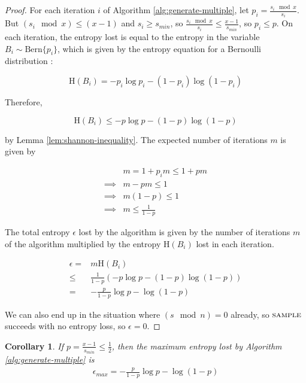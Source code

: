 \documentclass[lettersize,journal]{IEEEtran}
\newtheorem{corollary}{Corollary}
\newcommand{\bern}[1]{\mathrm{Bern}\{#1\}}
\newcommand{\Entropy}{\mathrm{H}}
\newcommand{\entropy}[1]{\Entropy(#1)}
\begin{document}
\begin{proof}
For each iteration $i$ of Algorithm \ref{alg:generate-multiple}, let $p_i = \frac{s_i \mod x}{s_i}$. But $(s_i \mod x) \le (x-1)$ and $s_i \ge s_{min}$, so $\frac{s_i \mod x}{s_i} \le \frac{x-1}{s_{min}}$, so $p_i \le p$. On each iteration, the entropy lost is equal to the entropy in the variable $B_i \sim \bern{p_i}$, which is given by the entropy equation for a Bernoulli distribution \cite{cover1999elements}:

\begin{equation}
\entropy{B_i} = -p_i\log p_i - (1-p_i)\log(1-p_i)
\end{equation}

Therefore, 

\begin{equation}
\entropy{B_i} \le -p\log p - (1-p)\log(1-p) 
\end{equation}

by Lemma \ref{lem:shannon-inequality}. The expected number of iterations $m$ is given by

\begin{align}
& m = 1 + p_im \le 1 + pm \\
\implies & m-pm \le 1 \\
\implies & m(1-p) \le 1 \\
\implies & m \le \frac{1}{1-p}
\end{align}

The total entropy $\epsilon$ lost by the algorithm is given by the number of iterations $m$ of the algorithm multiplied by the entropy $\entropy{B_i}$ lost in each iteration.

\begin{align}
\epsilon
    = & m\entropy{B_i} \\
    \le & \frac{1}{1-p}(-p\log p - (1-p)\log(1-p) ) \\
    = & -\frac{p}{1-p}\log p - \log(1-p)
\end{align}

We can also end up in the situation where $(s \mod n) = 0$ already, so $\textsc{sample}$ succeeds with no entropy loss, so $\epsilon=0$.
\end{proof}

\begin{corollary}
    If $p = \frac{x-1}{s_{min}} \le \frac{1}{2}$, then the maximum entropy lost by Algorithm \ref{alg:generate-multiple} is
\begin{align}
    \label{eq:epsilon-max}
    \epsilon_{max} = -\frac{p}{1-p}\log p - \log(1-p)
\end{align}
\end{corollary}
\end{document}
